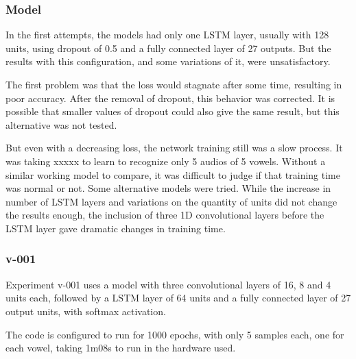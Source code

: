 

\subsubsection{Model}

In the first attempts, the models had only one LSTM layer, usually with 128 units, using dropout of 0.5 and a fully connected layer of 27 outputs. But the results with this configuration, and some variations of it, were unsatisfactory.

The first problem was that the loss would stagnate after some time, resulting in poor accuracy. After the removal of dropout, this behavior was corrected. It is possible that smaller values of dropout could also give the same result, but this alternative was not tested.

But even with a decreasing loss, the network training still was a slow process. It was taking xxxxx  to learn to recognize only 5 audios of 5 vowels.
Without a similar working model to compare, it was difficult to judge if that training time was normal or not. Some alternative models were tried. While the increase in number of LSTM layers and variations on the quantity of units did not change the results enough, the inclusion of three 1D convolutional layers before the LSTM layer gave dramatic changes in training time.



\subsubsection{v-001}

Experiment v-001 uses a model with three convolutional layers of 16, 8 and 4 units each, followed by a LSTM layer of 64 units and a fully connected layer of 27 output units, with softmax activation.

The code is configured to run for 1000 epochs, with only 5 samples each, one for each vowel, taking 1m08s to run in the hardware used.

